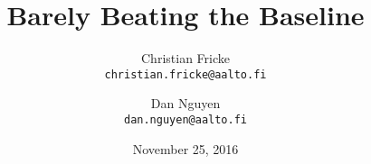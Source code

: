 
\title{Barely Beating the Baseline}

\author{
  \large Christian Fricke\\[-.2em]
  \texttt{\normalsize christian.fricke@aalto.fi}
  \and
  \large Dan Nguyen\\[-.2em]
  \texttt{\normalsize dan.nguyen@aalto.fi}
}

\date{\large November 25, 2016}

\maketitle

